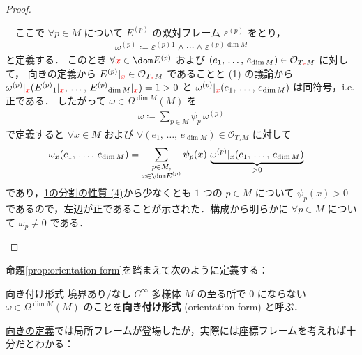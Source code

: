 \documentclass[geometry_main]{subfiles}
\begin{document}
\begin{proof}
\begin{enumerate}
		　ここで $\forall p \in M$ について $E^{(p)}$ の双対フレーム $\varepsilon^{(p)}$ をとり，
		\begin{align}
			\omega^{(p)} \coloneqq \varepsilon^{(p)}{}^1 \wedge \cdots \wedge \varepsilon^{(p)}{}^{\dim M}
		\end{align}
		と定義する．
		このとき $\forall \textcolor{red}{x} \in \dom E^{(p)}$ および $(e_1,\, \dots,\, e_{\dim M}) \in \mathcal{O}_{T_{\textcolor{red}{x}} M}$ に対して，
		向きの定義から $E^{(p)}|_{\textcolor{red}{x}} \in \mathcal{O}_{T_{\textcolor{red}{x}} M}$ であることと (1) の議論から
		$\omega^{(p)}|_{\textcolor{red}{x}} (E^{(p)}{}_1|_{\textcolor{red}{x}},\, \dots,\, E^{(p)}{}_{\dim M}|_{\textcolor{red}{x}}) = 1 > 0$ と $\omega^{(p)}|_{\textcolor{red}{x}} (e_1,\, \dots,\, e_{\dim M})$ は同符号，i.e. 正である．
		したがって $\omega \in \Omega^{\dim M}(M)$ を
		\begin{align}
			\omega \coloneqq \sum_{p \in M} \psi_p\, \omega^{(p)}
		\end{align}
		で定義すると $\forall x \in M$ および $\forall (e_1,\, \dots,\, e_{\dim M}) \in \mathcal{O}_{T_x M}$ に対して
		\begin{align}
			\omega_x (e_1,\, \dots,\, e_{\dim M})
			&= \sum_{\substack{p \in M, \\ x \in \dom E^{(p)}}} \psi_p (x)\, \underbrace{\omega^{(p)}|_x (e_1,\, \dots,\, e_{\dim M})}_{> 0}
		\end{align}
		であり，\hyperref[def:PoU]{1の分割の性質-(4)}から少なくとも $1$ つの $p \in M$ について $\psi_p(x) > 0$ であるので，左辺が正であることが示された．構成から明らかに $\forall p \in M$ について $\omega_p \neq 0$ である．
    \end{enumerate}
\end{proof}

命題\ref{prop:orientation-form}を踏まえて次のように定義する：

\begin{mydef}[label=def:orientation-form]{向き付け形式}
	境界あり/なし $C^\infty$ 多様体 $M$ の至る所で $0$ にならない $\omega \in \Omega^{\dim M}(M)$ のことを\textbf{向き付け形式} (orientation form) と呼ぶ．
\end{mydef}

\hyperref[def:smooth-orientation]{向きの定義}では局所フレームが登場したが，実際には座標フレームを考えれば十分だとわかる：
\end{document}
